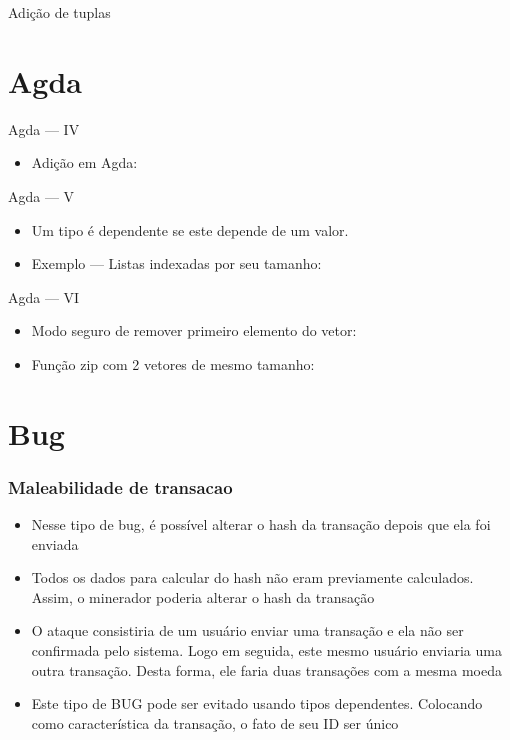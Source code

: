\documentclass{beamer}
\begin{document}
 \begin{frame}{Adição de tuplas}
  \end{frame}

\section{Agda}

\begin{frame}{Agda --- IV}
 \begin{itemize}
   \item Adição em Agda:
 \end{itemize}
\end{frame}

\begin{frame}{Agda --- V}
 \begin{itemize}
   \item Um tipo é dependente se este depende de um valor.
   \item Exemplo --- Listas indexadas por seu tamanho:
 \end{itemize}
\end{frame}

\begin{frame}{Agda --- VI}
 \begin{itemize}
   \item Modo seguro de remover primeiro elemento do vetor:
   \item Função zip com 2 vetores de mesmo tamanho:
 \end{itemize}
\end{frame}

\section{Bug}

 \begin{frame}
   \frametitle{Maleabilidade de transacao}
\begin{itemize}
  \item Nesse tipo de bug, é possível alterar o hash da transação depois que ela foi enviada
  \item Todos os dados para calcular do hash não eram previamente calculados. Assim, o minerador poderia alterar o hash da transação
  \item O ataque consistiria de um usuário enviar uma transação e ela não ser confirmada pelo sistema.
    Logo em seguida, este mesmo usuário enviaria uma outra transação. Desta forma, ele faria duas transações com a mesma moeda
  \item Este tipo de BUG pode ser evitado usando tipos dependentes. Colocando como característica da transação, o fato de seu ID ser único
\end{itemize}
\end{frame}
\end{document}
